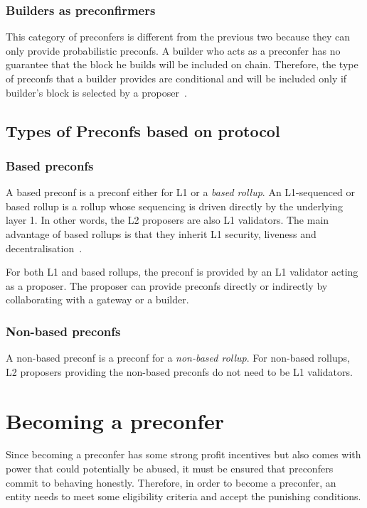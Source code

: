 \documentclass[conference]{IEEEtran}
\theoremstyle{boldstyle}
\begin{document}
        \subsubsection{Builders as preconfirmers}
    This category of preconfers is different from the previous two because they can only provide probabilistic preconfs. A builder who acts as a preconfer has no guarantee that the block he builds will be included on chain. Therefore, the type of preconfs that a builder provides are conditional and will be included only if builder's block is selected by a proposer~\cite{W:PreconfirmationFairExchange,W:LeaderlessandLeader-BasedPreconfirmations}.
    
    \subsection{Types of Preconfs based on protocol}
        \subsubsection{Based preconfs}
        A based preconf is a preconf either for L1 or a \textit{based rollup}. An L1-sequenced or based rollup is a rollup whose sequencing is driven directly by the underlying layer 1. In other words, the L2 proposers are also L1 validators. The main advantage of based rollups is that they inherit L1 security, liveness and decentralisation~\cite{W:BasedrollupssuperpowersfromL1sequencing,W:Value-CapturingBasedRollupswithBasedPreconfirmations}.

        For both L1 and based rollups, the preconf is provided by an L1 validator acting as a proposer. The proposer can provide preconfs directly or indirectly by collaborating with a gateway or a builder. 
        
        \subsubsection{Non-based preconfs}
        A non-based preconf is a preconf for a \textit{non-based rollup}. For non-based rollups, L2 proposers providing the non-based preconfs do not need to be L1 validators.
    
\section{Becoming a preconfer}
    Since becoming a preconfer has some strong profit incentives but also comes with power that could potentially be abused, it must be ensured that preconfers commit to behaving honestly. Therefore, in order to become a preconfer, an entity needs to meet some eligibility criteria and accept the punishing conditions. 
    
\end{document}
